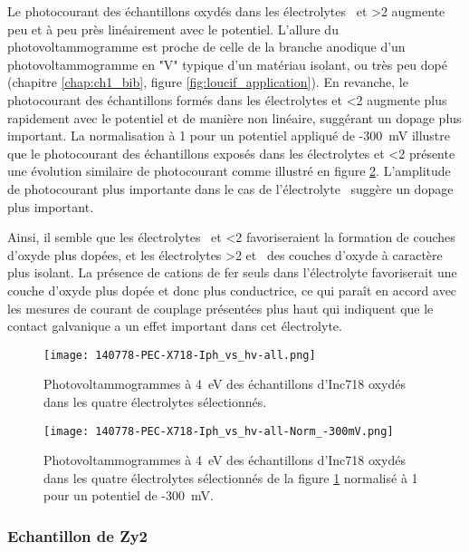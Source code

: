 \begin{refsection}
    Le photocourant des échantillons oxydés dans les électrolytes \water\ et \ratio >2 augmente peu et à peu près
    linéairement avec le potentiel. L’allure du photovoltammogramme est proche de celle de la branche anodique d’un
    photovoltammogramme en "V" typique d’un matériau  isolant, ou très peu dopé (chapitre \ref{chap:ch1_bib}, figure
    \ref{fig:loucif_application}). En revanche, le
    photocourant des échantillons formés dans les électrolytes \FeII et \ratio <2 augmente plus rapidement
    avec le potentiel et de manière non linéaire, suggérant un dopage plus important. La normalisation à 1 pour un potentiel
    appliqué de -300~mV illustre que le photocourant des échantillons exposés dans les électrolytes \FeII et
    \ratio <2 présente une évolution similaire de photocourant comme illustré en figure \ref{fig:ch4_photovolt_Inc718_Normalized}.
    L’amplitude de
    photocourant plus importante dans le cas de l’électrolyte \FeII\ suggère un dopage plus important.

    Ainsi, il semble que les électrolytes \FeII\ et \ratio <2 favoriseraient la formation de couches
    d’oxyde plus dopées, et les électrolytes \ratio >2 et \water\ des couches d’oxyde à caractère plus
    isolant. La présence de cations de fer seuls dans l’électrolyte favoriserait une couche d’oxyde plus dopée et
    donc plus conductrice, ce qui paraît en accord avec les mesures de courant de couplage présentées plus haut qui
    indiquent que le contact galvanique a un effet important dans cet électrolyte. 


    \begin{figure}[H]
        \centering
        \texttt{[image: 140778-PEC-X718-Iph\_vs\_hv-all.png]}
        \caption{Photovoltammogrammes à 4~eV des échantillons d’Inc718 oxydés dans les quatre électrolytes sélectionnés.}
        \label{fig:ch4_photovolt_Inc718}
    \end{figure}

    \begin{figure}[H]
        \centering
        \texttt{[image: 140778-PEC-X718-Iph\_vs\_hv-all-Norm\_-300mV.png]}
        \caption{Photovoltammogrammes à 4~eV des échantillons d’Inc718 oxydés dans les quatre électrolytes sélectionnés
        de la figure \ref{fig:ch4_photovolt_Inc718} normalisé à 1 pour un potentiel de -300~mV.}
        \label{fig:ch4_photovolt_Inc718_Normalized}
    \end{figure}




    \subsubsection{Echantillon de Zy2}\label{subsubsec:Zy2_samples}



\end{refsection}
